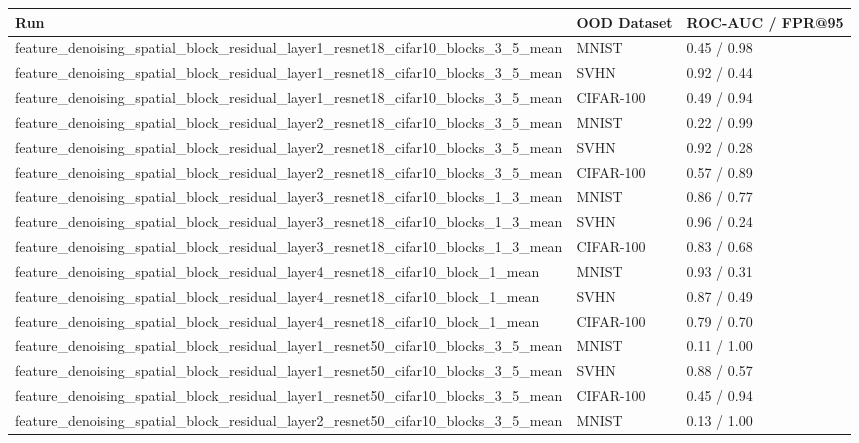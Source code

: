 \begin{tabular}{lll}
\toprule
Run & OOD Dataset & ROC-AUC / FPR@95 \\
\midrule
feature\_denoising\_spatial\_block\_residual\_layer1\_resnet18\_cifar10\_blocks\_3\_5\_mean & MNIST & 0.45 / 0.98 \\
feature\_denoising\_spatial\_block\_residual\_layer1\_resnet18\_cifar10\_blocks\_3\_5\_mean & SVHN & 0.92 / 0.44 \\
feature\_denoising\_spatial\_block\_residual\_layer1\_resnet18\_cifar10\_blocks\_3\_5\_mean & CIFAR-100 & 0.49 / 0.94 \\
feature\_denoising\_spatial\_block\_residual\_layer2\_resnet18\_cifar10\_blocks\_3\_5\_mean & MNIST & 0.22 / 0.99 \\
feature\_denoising\_spatial\_block\_residual\_layer2\_resnet18\_cifar10\_blocks\_3\_5\_mean & SVHN & 0.92 / 0.28 \\
feature\_denoising\_spatial\_block\_residual\_layer2\_resnet18\_cifar10\_blocks\_3\_5\_mean & CIFAR-100 & 0.57 / 0.89 \\
feature\_denoising\_spatial\_block\_residual\_layer3\_resnet18\_cifar10\_blocks\_1\_3\_mean & MNIST & 0.86 / 0.77 \\
feature\_denoising\_spatial\_block\_residual\_layer3\_resnet18\_cifar10\_blocks\_1\_3\_mean & SVHN & 0.96 / 0.24 \\
feature\_denoising\_spatial\_block\_residual\_layer3\_resnet18\_cifar10\_blocks\_1\_3\_mean & CIFAR-100 & 0.83 / 0.68 \\
feature\_denoising\_spatial\_block\_residual\_layer4\_resnet18\_cifar10\_block\_1\_mean & MNIST & 0.93 / 0.31 \\
feature\_denoising\_spatial\_block\_residual\_layer4\_resnet18\_cifar10\_block\_1\_mean & SVHN & 0.87 / 0.49 \\
feature\_denoising\_spatial\_block\_residual\_layer4\_resnet18\_cifar10\_block\_1\_mean & CIFAR-100 & 0.79 / 0.70 \\
feature\_denoising\_spatial\_block\_residual\_layer1\_resnet50\_cifar10\_blocks\_3\_5\_mean & MNIST & 0.11 / 1.00 \\
feature\_denoising\_spatial\_block\_residual\_layer1\_resnet50\_cifar10\_blocks\_3\_5\_mean & SVHN & 0.88 / 0.57 \\
feature\_denoising\_spatial\_block\_residual\_layer1\_resnet50\_cifar10\_blocks\_3\_5\_mean & CIFAR-100 & 0.45 / 0.94 \\
feature\_denoising\_spatial\_block\_residual\_layer2\_resnet50\_cifar10\_blocks\_3\_5\_mean & MNIST & 0.13 / 1.00 \\

\end{tabular}
